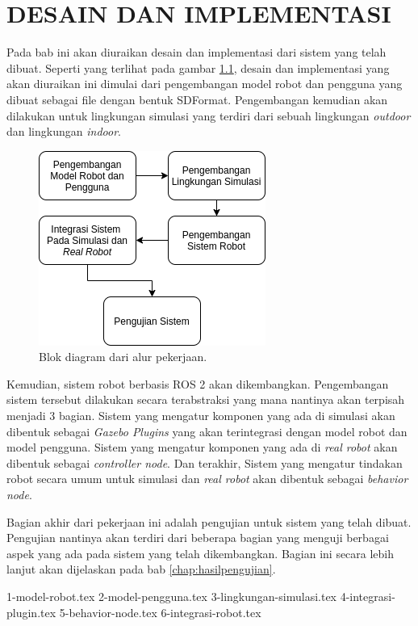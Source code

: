 \chapter{DESAIN DAN IMPLEMENTASI}
\label{chap:desainimplementasi}

Pada bab ini akan diuraikan desain dan implementasi dari sistem yang telah dibuat.
Seperti yang terlihat pada gambar \ref{fig:blogdiagramkerja},
  desain dan implementasi yang akan diuraikan ini dimulai dari pengembangan model robot dan pengguna yang dibuat sebagai file dengan bentuk SDFormat.
Pengembangan kemudian akan dilakukan untuk lingkungan simulasi yang terdiri dari sebuah lingkungan \emph{outdoor} dan lingkungan \emph{indoor}.

\begin{figure}[ht]
  \centering
  \includegraphics[scale=0.55]{gambar/blok-diagram-kerja.png}
  \caption{Blok diagram dari alur pekerjaan.}
  \label{fig:blogdiagramkerja}
\end{figure}

Kemudian, sistem robot berbasis ROS 2 akan dikembangkan.
Pengembangan sistem tersebut dilakukan secara terabstraksi yang mana nantinya akan terpisah menjadi 3 bagian.
Sistem yang mengatur komponen yang ada di simulasi akan dibentuk sebagai \emph{Gazebo Plugins} yang akan terintegrasi dengan model robot dan model pengguna.
Sistem yang mengatur komponen yang ada di \emph{real robot} akan dibentuk sebagai \emph{controller node}.
Dan terakhir, Sistem yang mengatur tindakan robot secara umum untuk simulasi dan \emph{real robot} akan dibentuk sebagai \emph{behavior node}.

Bagian akhir dari pekerjaan ini adalah pengujian untuk sistem yang telah dibuat.
Pengujian nantinya akan terdiri dari beberapa bagian yang menguji berbagai aspek yang ada pada sistem yang telah dikembangkan.
Bagian ini secara lebih lanjut akan dijelaskan pada bab \ref{chap:hasilpengujian}.

{1-model-robot.tex}
{2-model-pengguna.tex}
{3-lingkungan-simulasi.tex}
{4-integrasi-plugin.tex}
{5-behavior-node.tex}
{6-integrasi-robot.tex}
